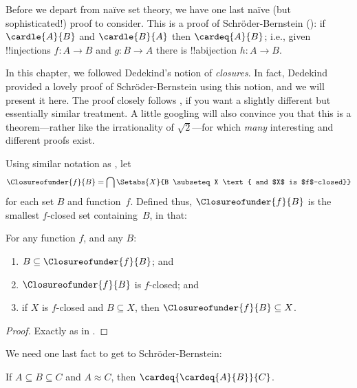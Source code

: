 \documentclass[../../../include/open-logic-section]{subfiles}
\begin{document}

Before we depart from na\"ive set theory, we have one last na\"ive
(but sophisticated!) proof to consider. This is a proof of
Schr\"oder-Bernstein (): if
$\cardle{A}{B}$ and $\cardle{B}{A}$ then $\cardeq{A}{B}$; i.e., given
!!{injection}s $f \colon A \to B$ and $g \colon B \to A$ there is
!!a{bijection} $h \colon A \to B$. 

In this chapter, we followed Dedekind's notion of \emph{closures}. In
fact, Dedekind provided a lovely proof of Schr\"oder-Bernstein using this notion, and we
will present it here. The proof closely follows
\cite[pp.~157--8]{Potter2004}, if you want a slightly different but
essentially similar treatment. A little googling will also convince
you that this is a theorem---rather like the irrationality of
$\sqrt{2}$---for which \emph{many} interesting and different proofs
exist.

Using similar notation as ,
let
\[
\Closureofunder{f}{B} = \bigcap \Setabs{X}{B \subseteq X 
\text{ and $X$ is $f$-closed}}
\]
for each set $B$ and function~$f$. Defined thus,
$\Closureofunder{f}{B}$ is the smallest $f$-closed set containing~$B$,
in that:

\begin{lem}
	For any function $f$, and any $B$:
	\begin{enumerate}
		\item{} $B \subseteq \Closureofunder{f}{B}$; and
		\item{} $\Closureofunder{f}{B}$ is $f$-closed; and
		\item{} if $X$ is $f$-closed and $B
		\subseteq X$, then $\Closureofunder{f}{B} \subseteq X$.
	\end{enumerate}
\end{lem}

\begin{proof}
Exactly as in .
\end{proof}

We need one last fact to get to Schr\"oder-Bernstein:

\begin{prop}
If $A \subseteq B \subseteq C$ and $A \approx C$, then $\cardeq{\cardeq{A}{B}}{C}$.
\end{prop}
\end{document}
